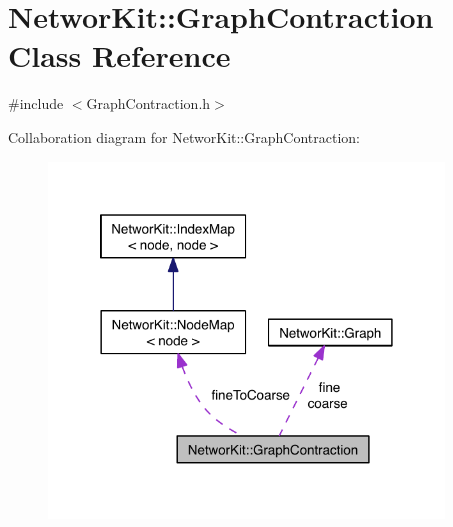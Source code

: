 \hypertarget{class_networ_kit_1_1_graph_contraction}{\section{Networ\-Kit\-:\-:Graph\-Contraction Class Reference}
\label{class_networ_kit_1_1_graph_contraction}
}


{\ttfamily \#include $<$Graph\-Contraction.\-h$>$}



Collaboration diagram for Networ\-Kit\-:\-:Graph\-Contraction\-:\nopagebreak
\begin{figure}[H]
\begin{center}
\leavevmode
\includegraphics[width=298pt]{class_networ_kit_1_1_graph_contraction__coll__graph}
\end{center}
\end{figure}
